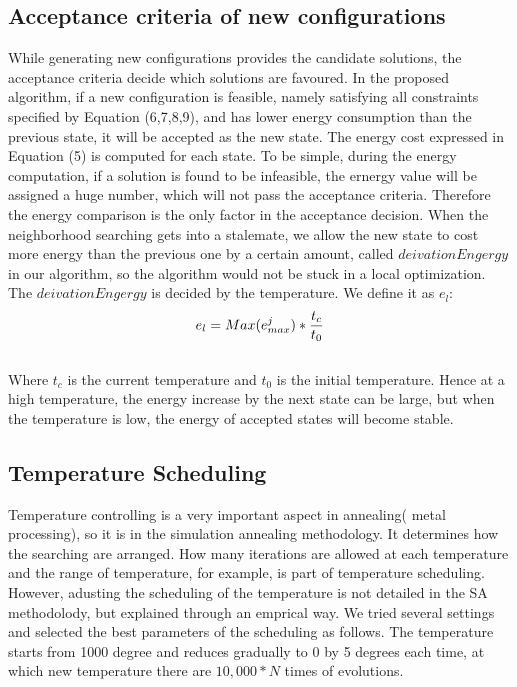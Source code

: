 \documentclass[10pt, conference, compsocconf]{IEEEtran}
\begin{document}
\subsection{ Acceptance criteria of new configurations}
While generating new configurations provides the candidate solutions, the
acceptance criteria decide which solutions are favoured. In the proposed
algorithm, if a new configuration is feasible, namely satisfying all constraints
specified by Equation (6,7,8,9), and has lower energy consumption than the
previous state, it will be accepted as the new state.
The energy cost expressed in Equation (5) is computed for each state. To be
simple, during the energy computation, if a solution is found to be infeasible,
the ernergy value will be assigned a huge number, which will not pass the
acceptance criteria. Therefore the energy comparison is the only factor in the
acceptance decision. When the neighborhood searching gets into a stalemate, we
allow the new state to cost more energy than the previous one by a certain
amount, called $deivationEngergy$ in our algorithm, so the algorithm would not
be stuck in a local optimization.
The $deivationEngergy$ is decided by the temperature. We define it as $e_l$:\\
\begin{equation}\label{11}
e_l=Max(e_{max}^j)*\frac{t_c}{t_0} \\
\end{equation}\\
Where $t_c$ is the current temperature and $t_0$ is the initial temperature.
Hence at a high temperature, the energy increase by the next state can be large,
but when the temperature is low, the energy of accepted states will become
stable.

\subsection{ Temperature Scheduling}
Temperature controlling is a very important aspect in annealing( metal
processing), so it is in the simulation annealing methodology. It determines how
the searching are arranged. How many iterations are allowed at each temperature
and the range of temperature, for example, is part of temperature scheduling.
However, adusting the scheduling of the temperature is not detailed in the SA
methodolody, but explained through an emprical way. We tried several settings
and selected the best parameters of the scheduling as follows. The temperature starts from 1000 degree and reduces
gradually to 0 by 5 degrees each time, at which new temperature there are $10,000*N$ times
of evolutions.
\end{document}

